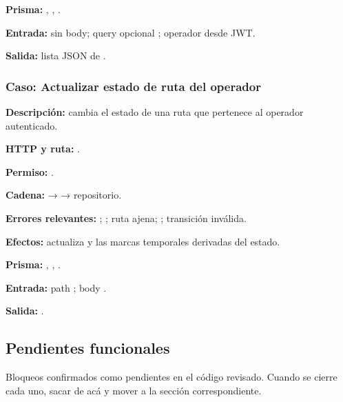 \textbf{Prisma:} \texttt{}, \texttt{}, \texttt{}.  

\textbf{Entrada:} sin body; query opcional \texttt{}; operador desde JWT.  

\textbf{Salida:} lista JSON de \texttt{}.


\subsubsection{Caso: Actualizar estado de ruta del operador}


\textbf{Descripción:} cambia el estado de una ruta que pertenece al operador autenticado.  

\textbf{HTTP y ruta:} \texttt{}.  

\textbf{Permiso:} \texttt{}.  

\textbf{Cadena:} \texttt{} → \texttt{} → repositorio.  

\textbf{Errores relevantes:} \texttt{}; \texttt{}; \texttt{} ruta ajena; \texttt{}; \texttt{} transición inválida.  

\textbf{Efectos:} actualiza \texttt{} y las marcas temporales derivadas del estado.  

\textbf{Prisma:} \texttt{}, \texttt{}, \texttt{}.  

\textbf{Entrada:} path \texttt{}; body \texttt{}.  

\textbf{Salida:} \texttt{}.


\subsection{Pendientes funcionales}

Bloqueos confirmados como pendientes en el código revisado. Cuando se cierre cada uno, sacar de acá y mover a la sección correspondiente.

